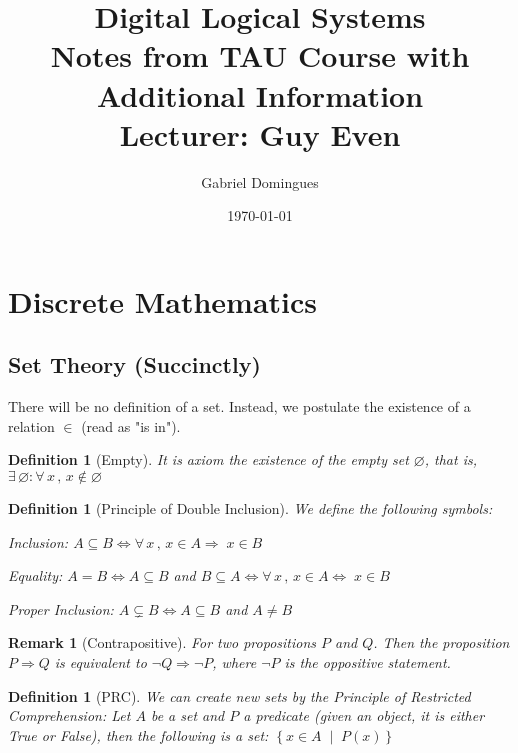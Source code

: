 \documentclass[12pt]{article}
\title{%
  Digital Logical Systems \\
  \large Notes from TAU Course with Additional Information \\
  Lecturer: Guy Even
}
\author{Gabriel Domingues}
\date{\today}
\let\emptyset\varnothing
\let\RA\Rightarrow
\let\LR\Leftrightarrow
\newcommand{\set}[2]{\left\{{#1}\;\middle|\;{#2}\right\}}
\newcommand{\Forall}[1]{\forall\,{#1}\,,\,}
\newcommand{\Exist}[1]{\exists\,{#1}:}
\newtheorem{definition}[theorem]{Definition}
\newtheorem{remark}[theorem]{Remark}
\begin{document}
\maketitle

\tableofcontents

\doclicenseThis

\pagebreak

\section{Discrete Mathematics}

\subsection{Set Theory (Succinctly)}

There will be no definition of a set. Instead, we postulate the existence of a relation $\in$ (read as "is in"). 

\begin{definition}[Empty]
  It is axiom the existence of the empty set $\emptyset$, that is, $\Exist{\emptyset}\Forall{x} x\notin\emptyset$
\end{definition}

\begin{definition}[Principle of Double Inclusion]
  We define the following symbols:
  \begin{compactitem}
    \item[] Inclusion: $A\subseteq B\LR \Forall{x} x\in A\RA \;x\in B$
    \item[] Equality: $A=B\LR A\subseteq B$ and $B\subseteq A\LR \Forall{x} x\in A\LR \;x\in B$
    \item[] Proper Inclusion: $A\subsetneq B\LR A\subseteq B$ and $A\neq B$
  \end{compactitem}
\end{definition}

\begin{remark}[Contrapositive]
  \label{contrapositive}
  For two propositions $P$ and $Q$. Then the proposition $P\RA Q$ is equivalent to $\neg Q \RA \neg P$, where $\neg P$ is the oppositive statement.
\end{remark}

\begin{definition}[PRC]
  \label{prc}
  We can create new sets by the Principle of Restricted Comprehension: Let $A$ be a set and $P$ a predicate (given an object, it is either True or False), then the following is a set: $\set{x\in A}{P(x)}$
\end{definition}
\end{document}
